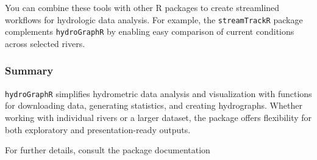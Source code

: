 \documentclass[
]{article}
\begin{document}
You can combine these tools with other R packages to create streamlined
workflows for hydrologic data analysis. For example, the
\texttt{streamTrackR} package complements \texttt{hydroGraphR} by
enabling easy comparison of current conditions across selected rivers.

\hypertarget{summary}{%
\subsubsection{Summary}\label{summary}}

\texttt{hydroGraphR} simplifies hydrometric data analysis and
visualization with functions for downloading data, generating
statistics, and creating hydrographs. Whether working with individual
rivers or a larger dataset, the package offers flexibility for both
exploratory and presentation-ready outputs.

For further details, consult the package documentation
\end{document}
